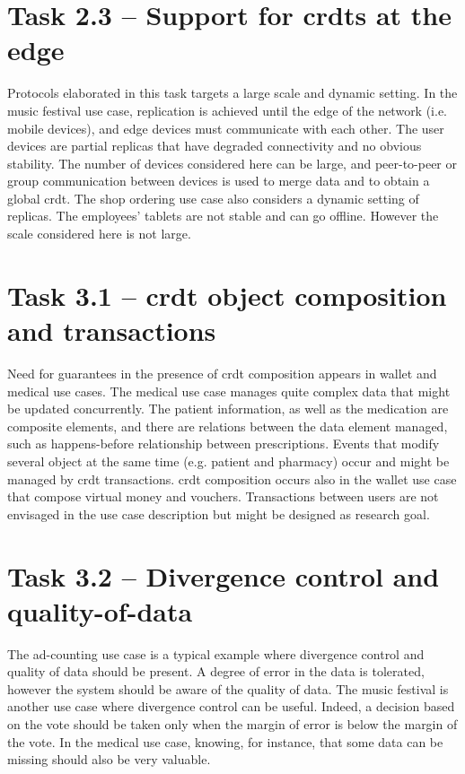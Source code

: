 \documentclass[11pt,a4paper]{report}
\begin{document}
\section{Task 2.3 --   Support for \glspl{crdt} at the edge}
Protocols elaborated in this task targets a large scale and dynamic setting. In the music festival use case, replication is achieved until the edge of the network (i.e. mobile devices), and edge devices must communicate with each other. The user devices are partial replicas that have degraded connectivity and no obvious stability. The number of devices considered here can be large, and peer-to-peer or group communication between devices is used to merge data and to obtain a global \gls{crdt}.
The shop ordering use case also considers a dynamic setting of replicas. The employees' tablets are not stable and can go offline. However the scale considered here is not large. 

\section{Task 3.1  --  \gls{crdt} object composition and transactions}
Need for guarantees in the presence of \gls{crdt} composition appears in wallet and medical use cases. The medical use case manages quite complex data that might be updated concurrently. The patient information, as well as the medication are composite elements, and there are relations between the data element managed, such as happens-before relationship between prescriptions. Events that modify several object at the same time (e.g. patient and pharmacy) occur and might be managed by \gls{crdt} transactions.
\gls{crdt} composition occurs also in the wallet use case that compose virtual money and vouchers. Transactions between users are not envisaged in the use case description but might be designed as research goal.   

\section{Task 3.2  --  Divergence control and quality-of-data}
The ad-counting use case is a typical example where divergence control and quality of data should be present. A degree of error in the data is tolerated, however the system should be aware of the quality of data. 
The music festival is another use case where divergence control can be useful. Indeed, a decision based on the vote should be taken only when the margin of error is below the margin of the vote. 
In the medical use case, knowing, for instance, that some data can be missing should also be very valuable.
\end{document}
